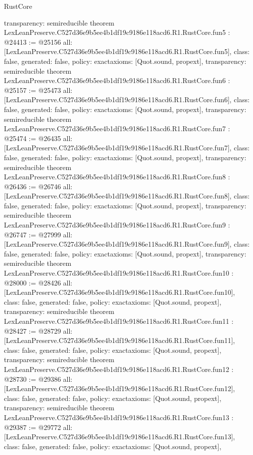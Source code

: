\begin{lexlean}{RustCore}
\begin{coremodule}
{  transparency: semireducible
}
theorem LexLeanPreserve.C527d36e9b5ee4b1df19c9186e118acd6.R1.RustCore.fun5 : @24413 := @25156 {
  all: [LexLeanPreserve.C527d36e9b5ee4b1df19c9186e118acd6.R1.RustCore.fun5],
  class: false,
  generated: false,
  policy: exact{axioms: [Quot.sound, propext]},
  transparency: semireducible
}
theorem LexLeanPreserve.C527d36e9b5ee4b1df19c9186e118acd6.R1.RustCore.fun6 : @25157 := @25473 {
  all: [LexLeanPreserve.C527d36e9b5ee4b1df19c9186e118acd6.R1.RustCore.fun6],
  class: false,
  generated: false,
  policy: exact{axioms: [Quot.sound, propext]},
  transparency: semireducible
}
theorem LexLeanPreserve.C527d36e9b5ee4b1df19c9186e118acd6.R1.RustCore.fun7 : @25474 := @26435 {
  all: [LexLeanPreserve.C527d36e9b5ee4b1df19c9186e118acd6.R1.RustCore.fun7],
  class: false,
  generated: false,
  policy: exact{axioms: [Quot.sound, propext]},
  transparency: semireducible
}
theorem LexLeanPreserve.C527d36e9b5ee4b1df19c9186e118acd6.R1.RustCore.fun8 : @26436 := @26746 {
  all: [LexLeanPreserve.C527d36e9b5ee4b1df19c9186e118acd6.R1.RustCore.fun8],
  class: false,
  generated: false,
  policy: exact{axioms: [Quot.sound, propext]},
  transparency: semireducible
}
theorem LexLeanPreserve.C527d36e9b5ee4b1df19c9186e118acd6.R1.RustCore.fun9 : @26747 := @27999 {
  all: [LexLeanPreserve.C527d36e9b5ee4b1df19c9186e118acd6.R1.RustCore.fun9],
  class: false,
  generated: false,
  policy: exact{axioms: [Quot.sound, propext]},
  transparency: semireducible
}
theorem LexLeanPreserve.C527d36e9b5ee4b1df19c9186e118acd6.R1.RustCore.fun10 : @28000 := @28426 {
  all: [LexLeanPreserve.C527d36e9b5ee4b1df19c9186e118acd6.R1.RustCore.fun10],
  class: false,
  generated: false,
  policy: exact{axioms: [Quot.sound, propext]},
  transparency: semireducible
}
theorem LexLeanPreserve.C527d36e9b5ee4b1df19c9186e118acd6.R1.RustCore.fun11 : @28427 := @28729 {
  all: [LexLeanPreserve.C527d36e9b5ee4b1df19c9186e118acd6.R1.RustCore.fun11],
  class: false,
  generated: false,
  policy: exact{axioms: [Quot.sound, propext]},
  transparency: semireducible
}
theorem LexLeanPreserve.C527d36e9b5ee4b1df19c9186e118acd6.R1.RustCore.fun12 : @28730 := @29386 {
  all: [LexLeanPreserve.C527d36e9b5ee4b1df19c9186e118acd6.R1.RustCore.fun12],
  class: false,
  generated: false,
  policy: exact{axioms: [Quot.sound, propext]},
  transparency: semireducible
}
theorem LexLeanPreserve.C527d36e9b5ee4b1df19c9186e118acd6.R1.RustCore.fun13 : @29387 := @29772 {
  all: [LexLeanPreserve.C527d36e9b5ee4b1df19c9186e118acd6.R1.RustCore.fun13],
  class: false,
  generated: false,
  policy: exact{axioms: [Quot.sound, propext]},
}
\end{coremodule}
\end{lexlean}
